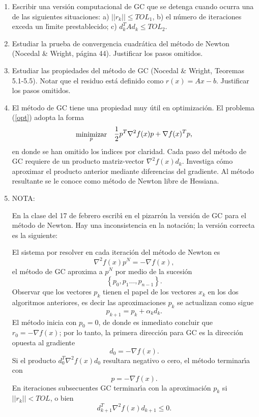 \documentclass[12pt]{article}
\newcommand{\bea}{\begin{eqnarray}}
\newcommand{\eea}{\end{eqnarray}}
\begin{document}
\begin{enumerate}
 \item Escribir una versi\'on computacional de GC que se detenga cuando ocurra una de las siguientes situaciones: a) $||r_k|| \le TOL_1$, b) el n\'umero de iteraciones exceda un l\'{\i}mite prestablecido; c) $d_k^TAd_k \le TOL_2$.
 \item Estudiar la prueba de convergencia cuadr\'atica del m\'etodo de Newton (Nocedal \& Wright, p\'agina 44). Justificar los pasos omitidos.
 \item Estudiar las propiedades del m\'etodo de GC (Nocedal \& Wright, Teoremas 5.1-5.5). Notar que el residuo est\'a definido como $r(x) = Ax -b$. Justificar los pasos omitidos.
 \item El m\'etodo de GC tiene una propiedad muy \'util en optimizaci\'on. El problema  (\ref{opt}) adopta la forma
 \bea  \label{opt_mod}
  \stackrel{\mbox{minimizar}}{ {}_p } & & \raisebox{1.0ex}{$\displaystyle  \frac{1}{2} p^T \nabla^2 f(x) p +  \nabla f(x)^Tp$,}
 \eea
 en donde se han omitido los \'{\i}ndices por claridad. Cada paso del m\'etodo de GC requiere de un producto matriz-vector $\nabla^2 f(x) d_k$. Investiga c\'omo aproximar el producto anterior mediante diferencias del gradiente. Al m\'etodo resultante se le conoce como m\'etodo de Newton libre de Hessiana.
 \item NOTA: 
 
 En la clase del 17 de febrero escrib\'{\i} en el pizarr\'on la versi\'on de GC para el m\'etodo de Newton. Hay una inconsistencia en la notaci\'on; la versi\'on correcta es la siguiente:
 
 El sistema por resolver en cada iteraci\'on del m\'etodo de Newton es
 \[
    \nabla^2 f(x) p^N = -\nabla f(x),
 \]
 el m\'etodo de GC aproxima a $p^N$ por medio de la sucesi\'on 
 \[
   \left \{ p_0,  p_1 \ldots,  p_{n-1} \right \}.
 \]
 Observar que los vectores $p_k$ tienen el papel de los vectores $x_k$ en los dos algoritmos anteriores, es decir las aproximaciones $p_k$ se actualizan como sigue
 \[
    p_{k+1} = p_k + \alpha_k d_k.
 \] 
 El m\'etodo inicia con  $p_0 = 0$, de donde es inmediato concluir que $r_0 = -\nabla f(x)$; por lo tanto,  la primera direcci\'on para GC es la direcci\'on opuesta al gradiente
\[
   d_0 = - \nabla f(x).
\]
Si el producto $d_0^T \nabla^2 f(x) d_0$ resultara negativo o cero, el m\'etodo terminar\'{\i}a con
\[ 
  p = -\nabla f(x).
\]
En iteraciones subsecuentes GC terminar\'{\i}a con la aproximaci\'on $p_k$  si $||r_k|| < TOL$, o bien 
\[
     d_{k+1}^T \nabla^2 f(x) d_{k+1} \le 0. 
\]


\end{enumerate}

\enddocument
\end{document}
